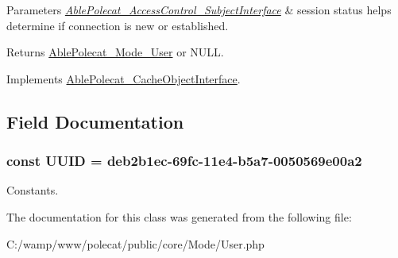 \begin{DoxyParams}{Parameters}
{\em \hyperlink{interface_able_polecat___access_control___subject_interface}{Able\+Polecat\+\_\+\+Access\+Control\+\_\+\+Subject\+Interface}} & session status helps determine if connection is new or established.\\
\hline
\end{DoxyParams}
\begin{DoxyReturn}{Returns}
\hyperlink{class_able_polecat___mode___user}{Able\+Polecat\+\_\+\+Mode\+\_\+\+User} or N\+U\+L\+L. 
\end{DoxyReturn}


Implements \hyperlink{interface_able_polecat___cache_object_interface_a3f2135f6ad45f51d075657f6d20db2cd}{Able\+Polecat\+\_\+\+Cache\+Object\+Interface}.



\subsection{Field Documentation}
\hypertarget{class_able_polecat___mode___user_a74b892c8c0b86bf9d04c5819898c51e7}{}
\subsubsection[{U\+U\+I\+D}]{\setlength{\rightskip}{0pt plus 5cm}const U\+U\+I\+D = \textquotesingle{}deb2b1ec-\/69fc-\/11e4-\/b5a7-\/0050569e00a2\textquotesingle{}}\label{class_able_polecat___mode___user_a74b892c8c0b86bf9d04c5819898c51e7}
Constants. 

The documentation for this class was generated from the following file\+:\begin{DoxyCompactItemize}
\item 
C\+:/wamp/www/polecat/public/core/\+Mode/User.\+php\end{DoxyCompactItemize}
